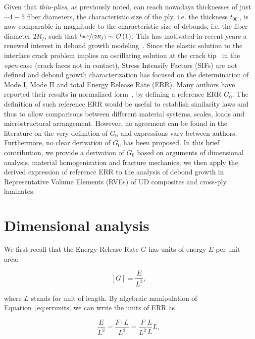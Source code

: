 \documentclass[a4paper,fleqn]{cas-dc}
\begin{document}
Given that \emph{thin-plies}, as previously noted, can reach nowadays thicknesses of just $\sim4-5$ fiber diameters, the characteristic size of the ply, i.e. the thickness $t_{90^{\circ}}$, is now comparable in magnitude to the characteristic size of debonds, i.e. the fiber diameter $2R_{f}$, such that $\nicefrac{t_{90^{\circ}}}{\left(2R_{f}\right)}\sim\mathcal{O}\left(1\right)$. This has motivated in recent years a renewed interest in debond growth modeling~\cite{Zhuang2018,Sandino2016,Varna2017,Sandino2018}. Since the elastic solution to the interface crack problem implies an oscillating solution at the crack tip~\cite{Comninou1977} in the \emph{open} case (crack faces not in contact), Stress Intensify Factors (SIFs) are not defined and debond growth characterization has focused on the determination of Mode I, Mode II and total Energy Release Rate (ERR). Many authors have reported their results in normalized form~\cite{Paris2007,Toya1974,Paris1996}, by defining a reference ERR $G_{0}$. The definition of such reference ERR would be useful to establish similarity laws and thus to allow comparisons between different material systems, scales, loads and microstructural arrangement. However, no agreement can be found in the literature on the very definition of $G_{0}$ and expressions vary between authors. Furthermore, no clear derivation of $G_{0}$ has been proposed. In this brief contribution, we provide a derivation of $G_{0}$ based on arguments of dimensional analysis, material homogenization and fracture mechanics; we then apply the derived expression of reference ERR to the analysis of debond growth in Representative Volume Elements (RVEs) of UD composites and cross-ply laminates. 

\section{Dimensional analysis}

We first recall that the Energy Release Rate $G$ has units of energy $E$ per unit area:

\begin{equation}\label{eq:errunits}
\left[G\right]=\frac{E}{L^{2}},
\end{equation}

where $L$ stands for unit of length. By algebraic manipulation of Equation~\ref{eq:errunits} we can write the units of ERR as

\begin{equation}\label{eq:errunitsreworked}
\frac{E}{L^{2}}=\frac{F\cdot L}{L^{2}}=\frac{F}{L^{2}}\frac{L}{L}L,
\end{equation}
\end{document}
